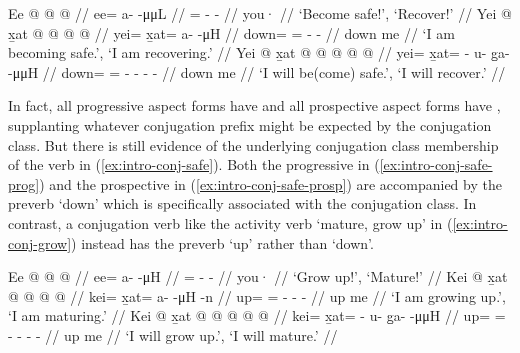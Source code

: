 \documentclass[12pt,letterpaper,oneside,article]{memoir}
\begin{document}
\pex\label{ex:intro-conj-safe}%
\a\label{ex:intro-conj-safe-imp}%
%
\begingl
	\gla	Ee @  @ {} @ {} //
	\glb	ee= a-  -μμL //
	\glc	{}= -  - //
	\gld	you·  {} {} //
	\glft	‘Become safe!’, ‘Recover!’
		//
\endgl
\a\label{ex:intro-conj-safe-prog}%
%
\begingl
	\gla	Yei @ x̱at @  @ {} @ {} @ {} //
	\glb	yei= x̱at= a-  -μH //
	\glc	down= = -  - //
	\gld	down me  //
	\glft	‘I am becoming safe.’, ‘I am recovering.’
		//
\endgl
\a\label{ex:intro-conj-safe-prosp}%
%
\begingl
	\gla	Yei @ x̱at @  @ {} @ {} @ {} @ {} //
	\glb	yei= x̱at= - u- g̱a-  -μμH //
	\glc	down= = - - -  - //
	\gld	down me  //
	\glft	‘I will be(come) safe.’, ‘I will recover.’
		//
\endgl
\xe

In fact, all progressive aspect forms have  and all prospective aspect forms have , supplanting whatever conjugation prefix might be expected by the conjugation class.
But there is still evidence of the underlying  conjugation class membership of the verb in (\ref{ex:intro-conj-safe}).
Both the progressive in (\ref{ex:intro-conj-safe-prog}) and the prospective in (\ref{ex:intro-conj-safe-prosp}) are accompanied by the preverb  ‘down’ which is specifically associated with the  conjugation class.
In contrast,  a  conjugation verb like the activity verb  ‘mature, grow up’ in (\ref{ex:intro-conj-grow}) instead has the preverb  ‘up’ rather than  ‘down’.

\pex\label{ex:intro-conj-grow}%
\a\label{ex:intro-conj-grow-imp}%
%
\begingl
	\gla	Ee @  @ {} @ {} //
	\glb	ee= a-  -μH //
	\glc	{}= -  - //
	\gld	you·\·  {} {} //
	\glft	‘Grow up!’, ‘Mature!’
		//
\endgl
\a\label{ex:intro-conj-grow-prog}%
%
\begingl
	\gla	Kei @ x̱at @  @ {} @ {} @ {} //
	\glb	kei= x̱at= a-  -μH -n //
	\glc	up= = -  - - //
	\gld	up me  //
	\glft	‘I am growing up.’, ‘I am maturing.’
		//
\endgl
\a\label{ex:intro-conj-grow-prosp}%
%
\begingl
	\gla	Kei @ x̱at @  @ {} @ {} @ {} @ {} //
	\glb	kei= x̱at= - u- g̱a-  -μμH //
	\glc	up= = - - -  - //
	\gld	up me  //
	\glft	‘I will grow up.’, ‘I will mature.’
		//
\endgl
\xe
\end{document}
